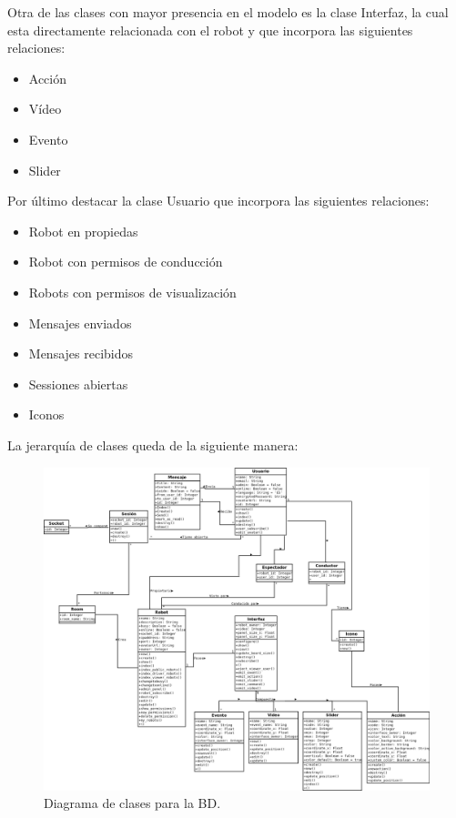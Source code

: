 Otra de las clases con mayor presencia en el modelo es la clase Interfaz, la cual esta directamente relacionada con el robot y que incorpora las siguientes relaciones:

\begin{itemize}
 \item Acción
 \item Vídeo
 \item Evento
 \item Slider
\end{itemize}

Por último destacar la clase Usuario que incorpora las siguientes relaciones:

\begin{itemize}
 \item Robot en propiedas
 \item Robot con permisos de conducción
 \item Robots con permisos de visualización
 \item Mensajes enviados
 \item Mensajes recibidos
 \item Sessiones abiertas
 \item Iconos
\end{itemize}



La jerarquía de clases queda de la siguiente manera:

\begin{figure}[H]
  \begin{center}
    \includegraphics[scale=0.35,angle=270]{diagramas/ModeloUML.png}
  \end{center}
  \caption{Diagrama de clases para la BD.}
  \label{diagram:caso-uso}
\end{figure}

